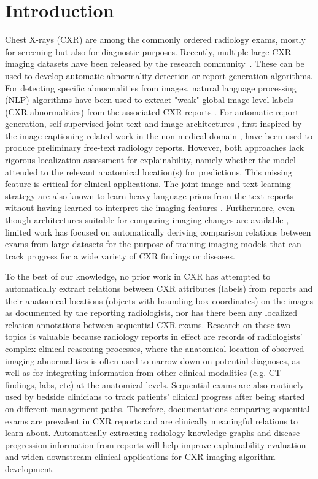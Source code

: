 \section*{Introduction}
Chest X-rays (CXR) are among the commonly ordered radiology exams, mostly for screening but also for diagnostic purposes. Recently, multiple large CXR imaging datasets have been released by the research community~\cite{johnson2019mimic,demner2016preparing,wang2017chestx,irvin2019chexpert}. These can be used to develop automatic abnormality detection or report generation algorithms. For detecting specific abnormalities from images, natural language processing (NLP) algorithms have been used to extract "weak" global image-level labels (CXR abnormalities) from the associated CXR reports \cite{irvin2019chexpert,wu2020ai,smit2020chexbert,bustos2020padchest}. For automatic report generation, self-supervised joint text and image architectures \cite{wang2018tienet,li2018hybrid,zhang2018learning,liu2019clinically,zhang2020radiology}, first inspired by the image captioning related work in the non-medical domain \cite{vinyals2015show,xu2015show,karpathy2015deep,plummer2015flickr30k,gan2017semantic}, have been used to produce preliminary free-text radiology reports. However, both approaches lack rigorous localization assessment for explainability, namely whether the model attended to the relevant anatomical location(s) for predictions. This missing feature is critical for clinical applications. The joint image and text learning strategy are also known to learn heavy language priors from the text reports without having learned to interpret the imaging features \cite{rohrbach2018object,agrawal2016analyzing}. Furthermore, even though architectures suitable for comparing imaging changes are available \cite{li2020siamese,li2020automated}, limited work has focused on automatically deriving comparison relations between exams from large datasets for the purpose of training imaging models that can track progress for a wide variety of CXR findings or diseases.

To the best of our knowledge, no prior work in CXR has attempted to automatically extract relations between CXR attributes (labels) from reports and their anatomical locations (objects with bounding box coordinates) on the images as documented by the reporting radiologists, nor has there been any localized relation annotations between sequential CXR exams. Research on these two topics is valuable because radiology reports in effect are records of radiologists' complex clinical reasoning processes, where the anatomical location of observed imaging abnormalities is often used to narrow down on potential diagnoses, as well as for integrating information from other clinical modalities (e.g. CT findings, labs, etc) at the anatomical levels. Sequential exams are also routinely used by bedside clinicians to track patients' clinical progress after being started on different management paths. Therefore, documentations comparing sequential exams are prevalent in CXR reports and are clinically meaningful relations to learn about. Automatically extracting radiology knowledge graphs and disease progression information from reports will help improve explainability evaluation and widen downstream clinical applications for CXR imaging algorithm development.

